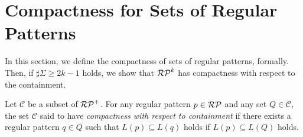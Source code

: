 \section{Compactness for Sets of Regular Patterns}

In this section, we define the compactness of sets of regular patterns, formally.
Then, if $\sharp\Sigma \ge 2k-1$ holds, 
we show that 
$\mathcal{RP}^{k}$ has compactness with respect to the containment.

\begin{dfn}\label{def:compactness}
Let $\mathcal{C}$ be a subset of $\mathcal{RP}^{+}$. 
For any regular pattern $p \in \mathcal{RP}$ and any set $Q \in \mathcal{C}$,
the set $\mathcal{C}$ said to have {\it compactness with respect to containment}
if there exists a regular pattern $q \in Q$ such that $L(p) \subseteq L(q)$ holds if $L(p) \subseteq L(Q)$ holds.
\end{dfn}

